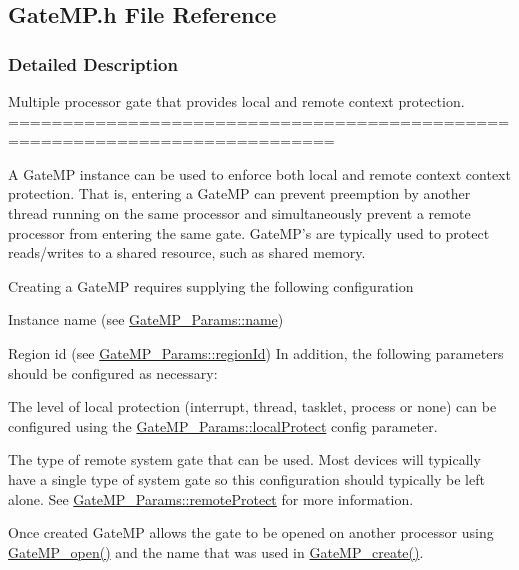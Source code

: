 \subsection{Gate\-M\-P.\-h File Reference}
\label{_gate_m_p_8h}


\subsubsection{Detailed Description}
Multiple processor gate that provides local and remote context protection. ============================================================================

A Gate\-M\-P instance can be used to enforce both local and remote context context protection. That is, entering a Gate\-M\-P can prevent preemption by another thread running on the same processor and simultaneously prevent a remote processor from entering the same gate. Gate\-M\-P's are typically used to protect reads/writes to a shared resource, such as shared memory.

Creating a Gate\-M\-P requires supplying the following configuration
\begin{DoxyItemize}
\item Instance name (see \hyperlink{struct_gate_m_p___params_a159f61c6e36fe603775dc4840121969b}{Gate\-M\-P\-\_\-\-Params\-::name})
\item Region id (see \hyperlink{struct_gate_m_p___params_a5af9a96f1fcf6f29b69c07207a33d453}{Gate\-M\-P\-\_\-\-Params\-::region\-Id}) In addition, the following parameters should be configured as necessary\-:
\item The level of local protection (interrupt, thread, tasklet, process or none) can be configured using the \hyperlink{struct_gate_m_p___params_ac080433fff177b3d5b1cd5dcafc9e28c}{Gate\-M\-P\-\_\-\-Params\-::local\-Protect} config parameter.
\item The type of remote system gate that can be used. Most devices will typically have a single type of system gate so this configuration should typically be left alone. See \hyperlink{struct_gate_m_p___params_a32a1870109d6aa6f583932aff19ebb50}{Gate\-M\-P\-\_\-\-Params\-::remote\-Protect} for more information.
\end{DoxyItemize}

Once created Gate\-M\-P allows the gate to be opened on another processor using \hyperlink{_gate_m_p_8h_acefd091d723ca21a0a02e1e1d5600fc8}{Gate\-M\-P\-\_\-open()} and the name that was used in \hyperlink{_gate_m_p_8h_ad83d284487eb5d7996318c7e8d88cf82}{Gate\-M\-P\-\_\-create()}.

